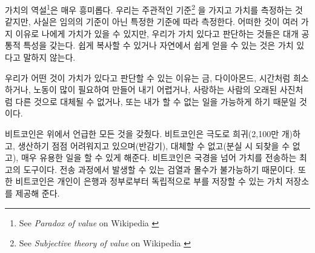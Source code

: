 \begin{comment}
This paradox of value\footnote{See \textit{Paradox of value} on Wikipedia
\cite{wiki:paradox-of-value}} shows something interesting about us humans: we
seem to value things on a subjective\footnote{See \textit{Subjective theory of
value} on Wikipedia \cite{wiki:subjective-theory-of-value}} basis, but do so
with certain non-arbitrary criteria. Something might be \textit{precious} to us
for a variety of reasons, but things we value do share certain characteristics.
If we can copy something very easily, or if it is naturally abundant, we do not
value it.
\end{comment}
가치의 역설\footnote{See \textit{Paradox of value} on Wikipedia \cite{wiki:paradox-of-value}}은 
매우 흥미롭다. 우리는 주관적인 기준\footnote{See \textit{Subjective theory of	value} on Wikipedia \cite{wiki:subjective-theory-of-value}}
을 가지고 가치를 측정하는 것 같지만,
사실은 임의의 기준이 아닌 특정한 기준에 따라 측정한다. 
어떠한 것이 여러 가지 이유로 나에게 가치가 있을 수 있지만, 우리가 가치 있다고 판단하는 것들은 대개 공통적 특성을 갖는다.
쉽게 복사할 수 있거나 자연에서 쉽게 얻을 수  있는 것은 가치 있다고 말하지 않는다. 

\begin{comment}
It seems that we value something because it is scarce (gold, diamonds,
time), difficult or labor-intensive to produce, can't be replaced (an
old photograph of a loved one), is useful in a way in which it enables
us to do things which we otherwise couldn't, or a combination of those,
such as great works of art.
\end{comment}
우리가 어떤 것이 가치가 있다고 판단할 수 있는 이유는 
금, 다이아몬드, 시간처럼 희소하거나,
노동이 많이 필요하여 만들어 내기 어렵거나, 
사랑하는 사람의 오래된 사진처럼 다른 것으로 대체될 수 없거나,
또는 내가 할  수 없는 일을 가능하게 하기 때문일 것이다. 

\begin{comment}
Bitcoin is all of the above: it is extremely rare (21 million),
increasingly hard to produce (reward halvening), can't be replaced (a
lost private key is lost forever), and enables us to do some quite
useful things. It is arguably the best tool for value transfer across
borders, virtually resistant to censorship and confiscation in the
process, plus, it is a self-sovereign store of value, allowing
individuals to store their wealth independent of banks and governments,
just to name two.
\end{comment}
비트코인은 위에서 언급한 모든 것을 갖췄다. 
비트코인은 극도로 희귀(2,100만 개)하고,
생산하기 점점 어려워지고 있으며(반감기),
대체할 수 없고(분실 시 되찾을 수 없고),
매우 유용한 일을 할 수 있게 해준다. 
비트코인은 국경을 넘어 가치를 전송하는 최고의 도구이다. 
전송 과정에서 발생할 수 있는 검열과 몰수가 불가능하기 때문이다. 
또한 비트코인은 개인이 은행과 정부로부터 독립적으로 부를 저장할 수 있는 가치 저장소를 제공해 준다.

